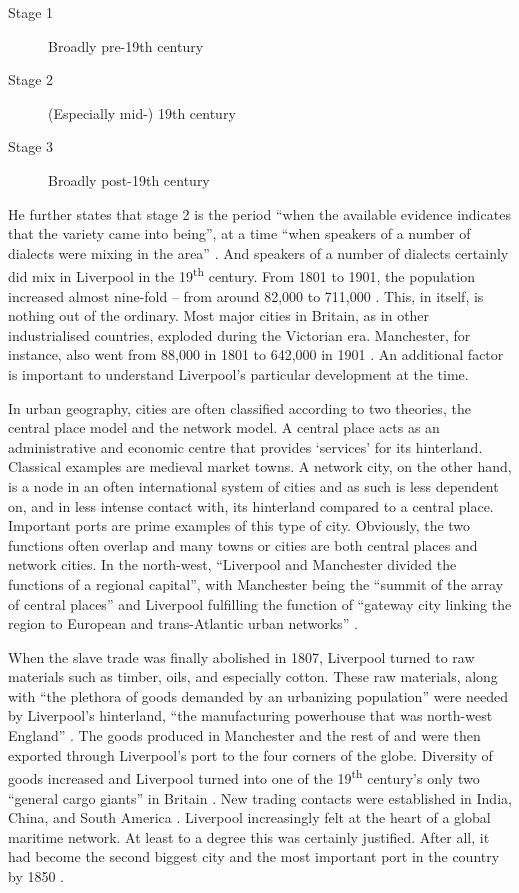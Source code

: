 	\begin{description}
		\item[Stage 1] Broadly pre-19th century
		\item[Stage 2] (Especially mid-) 19th century
		\item[Stage 3] Broadly post-19th century
	\end{description}

He further states that stage 2 is the period ``when the available evidence indicates that the variety came into being'', at a time ``when speakers of a number of dialects were mixing in the area'' \parencite[106--107]{honeybone2007}.
And speakers of a number of dialects certainly did mix in Liverpool in the 19\textsuperscript{th} century.
From 1801 to 1901, the population increased almost nine-fold -- from around 82,000 to 711,000 \parencite{gbhistgis}.
This, in itself, is nothing out of the ordinary.
Most major cities in Britain, as in other industrialised countries, exploded during the Victorian era.
Manchester, for instance, also went from 88,000 in 1801 to 642,000 in 1901 \parencite{gbhistgis}.
An additional factor is important to understand Liverpool's particular development at the time.

In urban geography, cities are often classified according to two theories, the central place model and the network model.
A central place acts as an administrative and economic centre that provides `services' for its hinterland. Classical examples are medieval market towns.
A network city, on the other hand, is a node in an often international system of cities and as such is less dependent on, and in less intense contact with, its hinterland compared to a central place.
Important ports are prime examples of this type of city.
Obviously, the two functions often overlap and many towns or cities are both central places and network cities.
In the north-west, ``Liverpool and Manchester divided the functions of a regional capital'', with Manchester being the ``summit of the array of central places'' and Liverpool fulfilling the function of ``gateway city linking the region to European and trans-Atlantic urban networks'' \citep[188--189]{hohenberglees1985}.

When the slave trade was finally abolished in 1807, Liverpool turned to raw materials such as timber, oils, and especially cotton.
These raw materials, along with ``the plethora of goods demanded by an urbanizing population'' were needed by Liverpool's hinterland, ``the manufacturing powerhouse that was north-west England'' \parencite[258]{milne2006}.
The goods produced in Manchester and the rest of  and  were then exported through Liverpool's port to the four corners of the globe.
Diversity of goods increased and Liverpool turned into one of the 19\textsuperscript{th} century's only two ``general cargo giants'' in Britain \parencite[259]{milne2006}.
New trading contacts were established in India, China, and South America .
Liverpool increasingly felt at the heart of a global maritime network.
At least to a degree this was certainly justified.
After all, it had become the second biggest city and the most important port in the country by 1850 \citep[cf.][113--114]{honeybone2007}.

